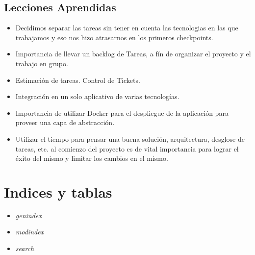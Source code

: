 \documentclass[letterpaper,10pt,english]{sphinxmanual}
\begin{document}
\section{Lecciones Aprendidas}
\label{manuals:lecciones-aprendidas}\begin{itemize}
\item {} 
Decidimos separar las tareas sin tener en cuenta las tecnologias en las que trabajamos y eso nos hizo atrasarnos en los primeros checkpoints.

\item {} 
Importancia de llevar un backlog de Tareas, a fín de organizar el proyecto y el trabajo en grupo.

\item {} 
Estimación de tareas. Control de Tickets.

\item {} 
Integración en un solo aplicativo de varias tecnologías.

\item {} 
Importancia de utilizar Docker para el despliegue de la aplicación para proveer una capa de abstracción.

\item {} 
Utilizar el tiempo para pensar una buena solución, arquitectura, desglose de tareas, etc. al comienzo del proyecto es de vital importancia para lograr el éxito del mismo y limitar los cambios en el mismo.

\end{itemize}


\chapter{Indices y tablas}
\label{index:indices-y-tablas}\begin{itemize}
\item {} 
\emph{genindex}

\item {} 
\emph{modindex}

\item {} 
\emph{search}

\end{itemize}



\renewcommand{\indexname}{Index}
\printindex
\end{document}
